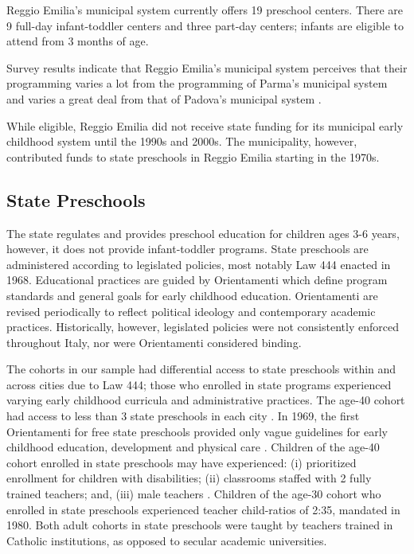 Reggio Emilia's municipal system currently offers 19 preschool centers. There are 9 full-day infant-toddler centers and three part-day centers; infants are eligible to attend from 3 months of age. 

Survey results indicate that Reggio Emilia's municipal system perceives that their programming varies a lot from the programming of Parma's municipal system and varies a great deal from that of Padova's municipal system \citep{CEHD_2016_Historical-Analysis}. 

While eligible, Reggio Emilia did not receive state funding for its municipal early childhood system until the 1990s and 2000s. The municipality, however, contributed funds to state preschools in Reggio Emilia starting in the 1970s. 

\subsection{State Preschools}

The state regulates and provides preschool education for children ages 3-6 years, however, it does not provide infant-toddler programs. State preschools are administered according to legislated policies, most notably Law 444 enacted in 1968. Educational practices are guided by Orientamenti which define program standards and general goals for early childhood education. Orientamenti are revised periodically to reflect political ideology and contemporary academic practices. Historically, however, legislated policies were not consistently enforced throughout Italy, nor were Orientamenti considered binding. 

The cohorts in our sample had differential access to state preschools within and across cities due to Law 444; those who enrolled in state programs experienced varying early childhood curricula and administrative practices. The age-40 cohort had access to less than 3 state preschools in each city \citep{Reggio-Admin-data_1966-2006,Reggio-Annual-Journals_1994-2011,Padova-Admin-Data_1964-2011}. In 1969, the first Orientamenti for free state preschools provided only vague guidelines for early childhood education, development and physical care \citep{Corsaro_1996_Early-Edu,Hohnerlein_2015_Development-and-Diffusion}. Children of the age-40 cohort enrolled in state preschools may have experienced: (i) prioritized enrollment for children with disabilities; (ii) classrooms staffed with 2 fully trained teachers; and, (iii) male teachers \citep{Hohnerlein_2015_Development-and-Diffusion}. Children of the age-30 cohort who enrolled in state preschools experienced teacher child-ratios of 2:35, mandated in 1980. Both adult cohorts in state preschools were taught by teachers trained in Catholic institutions, as opposed to secular academic universities.

